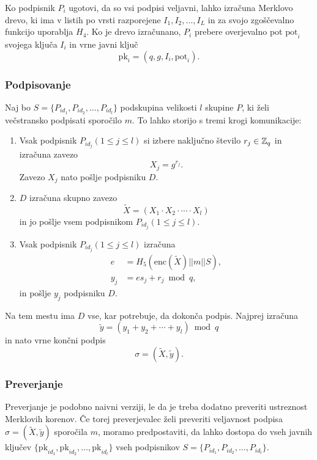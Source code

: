 Ko podpisnik $P_i$ ugotovi, da so vsi podpisi veljavni, lahko izračuna Merklovo drevo, ki ima v
listih po vrsti razporejene $I_1, I_2, \dots, I_L$ in za svojo zgoščevalno funkcijo uporablja $H_4$.
Ko je drevo izračunano, $P_i$ prebere overjevalno pot $\text{pot}_i$ svojega ključa $I_i$ in vrne
javni ključ
$$ 
\text{pk}_i = (q, g, I_i, \text{pot}_i).
$$

\subsubsection{Podpisovanje}
Naj bo $S = \{P_{id_1}, P_{id_2}, \dots, P_{id_l}\}$ podskupina velikosti $l$ skupine $P$, ki želi
večstransko podpisati sporočilo $m$. To lahko storijo s tremi krogi komunikacije:
\begin{enumerate}
    \item Vsak podpisnik $P_{id_j} (1 \le j \le l)$ si izbere naključno število $r_j \in \mathbb Z_q$
        in izračuna zavezo
        $$
        X_j = g^{r_j}.
        $$
        Zavezo $X_j$ nato pošlje podpisniku $D$.
    \item $D$ izračuna skupno zavezo
        $$
        \tilde{X} = (X_1 \cdot X_2 \cdot \cdots \cdot X_l)
        $$
        in jo pošlje vsem podpisnikom $P_{id_j} (1 \le j \le l)$.
    \item Vsak podpisnik $P_{id_j} (1 \le j \le l)$ izračuna
        \begin{align*}
            e &= H_5(\text{enc}(\tilde{X}) || m || S), \\
            y_j &= e s_j + r_j \bmod q,
        \end{align*}
        in pošlje $y_j$ podpisniku $D$.
\end{enumerate}
Na tem mestu ima $D$ vse, kar potrebuje, da dokonča podpis. Najprej izračuna
$$
\tilde{y} = (y_1 + y_2 + \cdots + y_l) \bmod q
$$
in nato vrne končni podpis
$$
\sigma = (\tilde{X}, \tilde{y}).
$$

\subsubsection{Preverjanje}
Preverjanje je podobno naivni verziji, le da je treba dodatno preveriti ustreznost Merklovih
korenov. Če torej preverjevalec želi preveriti veljavnost podpisa $\sigma = (\tilde{X}, \tilde{y})$
sporočila $m$, moramo predpostaviti, da lahko dostopa do vseh javnih ključev $\{\text{pk}_{id_1},
\text{pk}_{id_2}, \dots, \text{pk}_{id_l}\}$ vseh podpisnikov $S = \{P_{id_1}, P_{id_2}, \dots, 
P_{id_l}\}$.

